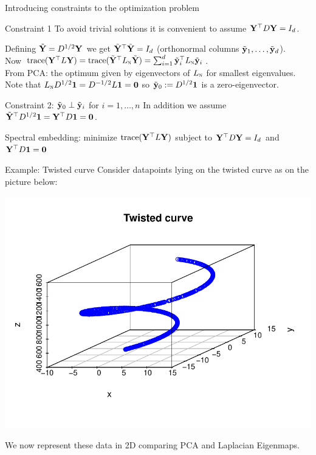 \documentclass[11pt,handout,aspectratio=169]{beamer}
\begin{document}
\begin{frame}{Introducing constraints to the optimization problem}
	\begin{block}{Constraint 1}
		To avoid trivial solutions it is convenient to assume $\mathbf{Y}^\top D \mathbf{Y}=I_d$.\\[2mm]
	\end{block}
Defining $\tilde{\mathbf{Y}}=D^{1/2}\mathbf{Y}$ we get $\tilde{\mathbf{Y}}^\top \tilde{\mathbf{Y}}=I_d$ (orthonormal \alert{columns} $\tilde{\mathbf{y}}_1,\ldots,\tilde{\mathbf{y}}_d$).\\[3mm]
Now $\text{trace}(\mathbf{Y}^\top L\mathbf{Y})=\text{trace}(\tilde{\mathbf{Y}}^\top L_{\textsc{n}}\tilde{\mathbf{Y}})=\sum_{i=1}^d \tilde{\mathbf{y}}_i^\top L_{\textsc{n}}\tilde{\mathbf{y}}_i$.\\[3mm]
From PCA: the optimum given by eigenvectors of $L_{\textsc{n}}$ for \alert{smallest} eigenvalues.\\[2mm] 
Note that $L_{\textsc{n}} D^{1/2}\boldsymbol 1=D^{-1/2}L\boldsymbol 1=\boldsymbol 0$ so $\tilde{\mathbf{y}}_0:=D^{1/2}\boldsymbol 1$ is a zero-eigenvector.
\begin{block}{Constraint 2: $\tilde{\mathbf{y}}_0\perp \tilde {\mathbf{y}}_i$ for $i=1,\ldots,n$}
		In addition we assume $\tilde{\mathbf{Y}}^\top D^{1/2}\boldsymbol 1=\mathbf{Y}^{\top} D \mathbf{1} = \mathbf{0}$.
\end{block}
\begin{alertblock}{}
\alert{Spectral embedding}:	minimize $\text{trace}(\mathbf{Y}^\top L \mathbf{Y})$ subject to $\mathbf{Y}^\top D\mathbf{Y}=I_d$ and $\mathbf{Y}^{\top} D \mathbf{1} = \mathbf{0}$
\end{alertblock}

\end{frame}


\begin{frame}{Example: Twisted curve}
Consider datapoints lying on the twisted curve as on the picture below:
	\begin{center}
		\includegraphics[scale=.7]{pics/twisted.pdf}
	\end{center}
We now represent these data in 2D comparing PCA and Laplacian Eigenmaps.
\end{frame}
\end{document}
